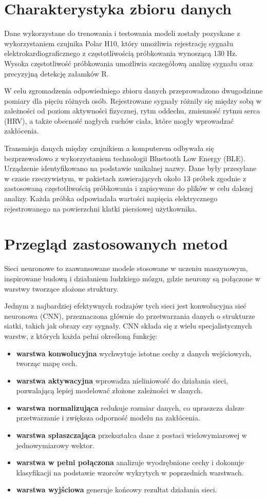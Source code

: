 \documentclass{article}
\begin{document}
\section{Charakterystyka zbioru danych}
Dane wykorzystane do trenowania i testowania modeli zostały pozyskane z wykorzystaniem czujnika Polar H10, który umożliwia rejestrację sygnału elektrokardiograficznego z częstotliwością próbkowania wynoszącą 130 Hz. Wysoka częstotliwość próbkowania umożliwia szczegółową analizę sygnału oraz precyzyjną detekcję załamków R.


W celu zgromadzenia odpowiedniego zbioru danych przeprowadzono dwugodzinne pomiary dla pięciu różnych osób. Rejestrowane sygnały różniły się między sobą w zależności od poziom aktywności fizycznej, rytm oddechu, zmienność rytmu serca (HRV), a także obecność nagłych ruchów ciała, które mogły wprowadzać zakłócenia.


Transmisja danych między czujnikiem a komputerem odbywała się bezprzewodowo z wykorzystaniem technologii Bluetooth Low Energy (BLE). Urządzenie identyfikowano na podstawie unikalnej nazwy. Dane były przesyłane w czasie rzeczywistym, w pakietach zawierających około 13 próbek zgodnie z zastosowaną częstotliwością próbkowania i zapisywane do plików w celu dalszej analizy. Każda próbka odpowiadała wartości napięcia elektrycznego rejestrowanego na powierzchni klatki piersiowej użytkownika.

\section{Przegląd zastosowanych metod}
Sieci neuronowe to zaawansowane modele stosowane w uczeniu maszynowym, inspirowane budową i działaniem ludzkiego mózgu, gdzie neurony są połączone w warstwy tworzące złożone struktury.

Jednym z najbardziej efektywnych rodzajów tych sieci jest konwolucyjna sieć neuronowa (CNN), przeznaczona głównie do przetwarzania danych o strukturze siatki, takich jak obrazy czy sygnały. CNN składa się z wielu specjalistycznych warstw, z których każda pełni określoną funkcję:
\begin{itemize}
    \item \textbf{warstwa konwolucyjna} wychwytuje istotne cechy z danych wejściowych, tworząc mapę cech.
    \item \textbf{warstwa aktywacyjna} wprowadza nieliniowość do działania sieci, pozwalającą lepiej modelować złożone zależności w danych.
    \item \textbf{warstwa normalizująca} redukuje rozmiar danych, co upraszcza dalsze przetwarzanie i zwiększa odporność modelu na zakłócenia.
    \item \textbf{warstwa spłaszczająca} przekształca dane z postaci wielowymiarowej w jednowymiarowy wektor.
    \item \textbf{warstwa w pełni połączona}  analizuje wyodrębnione cechy i dokonuje klasyfikacji na podstawie wzorców wykrytych w poprzednich warstwach.
    \item \textbf{warstwa wyjściowa} generuje końcowy rezultat działania sieci.
\end{itemize}
\end{document}
